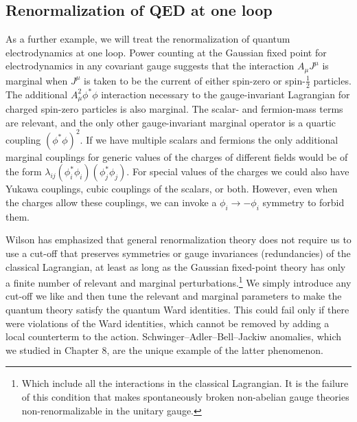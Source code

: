 \subsection{Renormalization of QED at one loop}

As a further example, we will treat the renormalization of quantum
electrodynamics at one loop. Power counting at the Gaussian fixed point for
electrodynamics in any covariant gauge suggests that the interaction $A_\mu J^\mu$
is marginal when $J^\mu$ is taken to be the current of either spin-zero or
spin-$\tfrac12$ particles. The additional $A_\mu^2\phi^*\phi$ interaction
necessary to the gauge-invariant Lagrangian for charged spin-zero particles is
also marginal. The scalar- and fermion-mass terms are relevant, and the only
other gauge-invariant marginal operator is a quartic coupling
$(\phi^*\phi)^2$. If we have multiple scalars and fermions the only additional
marginal couplings for generic values of the charges of different fields would be
of the form $\lambda_{ij}(\phi_i^*\phi_i)(\phi_j^*\phi_j)$. For special values
of the charges we could also have Yukawa couplings, cubic couplings of the
scalars, or both. However, even when the charges allow these couplings, we can
invoke a $\phi_i\to-\phi_i$ symmetry to forbid them.

Wilson has emphasized that general renormalization theory does not require us to
use a cut-off that preserves symmetries or gauge invariances (redundancies) of
the classical Lagrangian, at least as long as the Gaussian fixed-point theory has
only a finite number of relevant and marginal perturbations.\footnote[11]{Which
include all the interactions in the classical Lagrangian. It is the failure of
this condition that makes spontaneously broken non-abelian gauge theories
non-renormalizable in the unitary gauge.} We simply introduce any cut-off we
like and then tune the relevant and marginal parameters to make the quantum
theory satisfy the quantum Ward identities. This could fail only if there were
violations of the Ward identities, which cannot be removed by adding a local
counterterm to the action. Schwinger--Adler--Bell--Jackiw anomalies, which we
studied in Chapter 8, are the unique example of the latter phenomenon.

